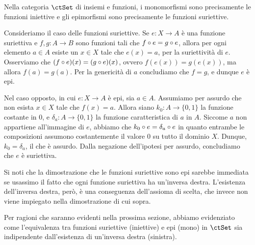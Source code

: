 \begin{example}\label{monoepi_in_set}
	Nella categoria \(\ctSet\) di insiemi e funzioni, i monomorfismi sono precisamente le funzioni iniettive	e gli epimorfismi sono precisamente le funzioni suriettive.

	Consideriamo il caso delle funzioni suriettive.	Se \(e \colon X \to A\) è una funzione suriettiva e \(f, g \colon A \to B\) sono funzioni tali che \(f \circ e = g \circ e\),	allora per ogni elemento \(a \in A\) esiste un \(x \in X\) tale che \(e(x) = a\), per la suriettività di \(e\).	Osserviamo che \((f \circ e)(x) = (g \circ e)(x)\), ovvero \(f(e(x)) = g(e(x))\),	ma allora \(f(a) = g(a)\).	Per la genericità di \(a\) concludiamo che \(f = g\), e dunque \(e\) è epi.

	Nel caso opposto, in cui \(e \colon X \to A\) è epi, sia \(a \in A\).
	Assumiamo per assurdo che non esista \(x \in X\) tale che \(f(x) = a\).
	Allora siano \(k_0 \colon A \to \{0, 1\}\) la funzione costante in \(0\),
	e \(\delta_a \colon A \to \{0, 1\}\) la funzione caratteristica di \(a\) in \(A\).
	Siccome \(a\) non appartiene all'immagine di \(e\), abbiamo che \(k_0 \circ e = \delta_a \circ e\)
	in quanto entrambe le composizioni assumono costantemente il valore \(0\) su tutto il dominio \(X\).
	Dunque, \(k_0 = \delta_a\), il che è assurdo.
	Dalla negazione dell'ipotesi per assurdo, concludiamo che \(e\) è suriettiva.
\end{example}

Si noti che la dimostrazione che le funzioni suriettive sono epi sarebbe immediata
se usassimo il fatto che ogni funzione suriettiva ha un'inversa destra.
L'esistenza dell'inversa destra, però, è una conseguenza dell'assioma di scelta,
che invece non viene impiegato nella dimostrazione di cui sopra.

Per ragioni che saranno evidenti nella prossima sezione,
abbiamo evidenziato come l'equivalenza tra funzioni suriettive (iniettive)
e epi (mono) in \(\ctSet\) sia indipendente dall'esistenza di un'inversa destra (sinistra).

